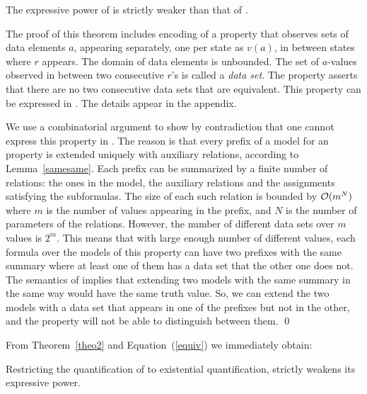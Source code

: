 \begin{theorem}
\label{theo2}
The expressive power of \EPFLTL{} is strictly weaker than that of \QPFLTL{}.
\end{theorem}

The proof of this theorem includes encoding of a  property that
observes sets of data elements $a$, appearing separately, one per state as $v (a)$,
in between states where $r$ appears. The domain of data elements is unbounded.
The set of $a$-values observed in between two consecutive $r$'s is called a {\em data set}.
The property asserts that there are no two consecutive data sets that are equivalent.
This property can be expressed in \QPFLTL{}. The details appear in the appendix.

We use a combinatorial argument to show by contradiction that one cannot express this property
in \EPFLTL{}. The reason is that every prefix of a model for an \EPFLTL{} property is extended uniquely with
auxiliary relations, according to Lemma~\ref{samesame}. Each prefix can be summarized by a finite number of relations: the ones in
the model, the auxiliary relations and the
assignments satisfying the subformulas. The size of
each such relation is bounded by ${\cal O} (  m ^ N )$
where $m$ is the number of values appearing in the
prefix, and $N$ is the number of parameters of the relations.
However, the number of different data sets over $m$ values is
$2^m$. This means that with large enough number of different values, each \EPFLTL{} formula over the models of this property can have two prefixes with the same summary where at least one of them has a data set that the other one does not. The semantics of \EPFLTL{} implies that extending
two models with the same summary in the same way would have the same truth value. So, we can extend
the two models with a data set that appears in one of the
prefixes but not  in the other, and the \EPFLTL{} property will not be able to distinguish between them. \qed



\vspace{0.7ex} From Theorem~\ref{theo2} and Equation~(\ref{equiv}) we immediately obtain:
\begin{corollary}
Restricting the quantification of \QPFLTL{} to existential quantification, strictly weakens its expressive power.
\end{corollary}

